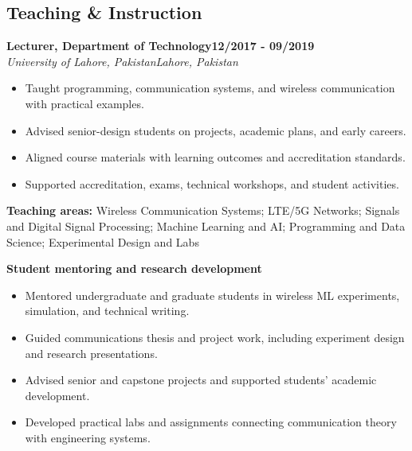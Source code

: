 \documentclass[9pt,letterpaper]{extarticle}
\newcommand{\role}[4]{%
  \Needspace{4\baselineskip}\textbf{#1}\hfill\textbf{#2}\\[-1pt]
  \textit{#3}\hfill\textit{#4}\par}
\begin{document}
\subsection{Teaching \& Instruction}
\role{Lecturer, Department of Technology}{12/2017 - 09/2019}{University of Lahore, Pakistan}{Lahore, Pakistan}
\begin{itemize}
\item Taught programming, communication systems, and wireless communication with practical examples.
\item Advised senior-design students on projects, academic plans, and early careers.
\item Aligned course materials with learning outcomes and accreditation standards.
\item Supported accreditation, exams, technical workshops, and student activities.
\end{itemize}
\vspace{1pt}
{\small\textbf{Teaching areas:} Wireless Communication Systems; LTE/5G Networks; Signals and Digital Signal Processing; Machine Learning and AI; Programming and Data Science; Experimental Design and Labs}\par
{}\noindent\textbf{Student mentoring and research development}\par
\begin{itemize}
\item Mentored undergraduate and graduate students in wireless ML experiments, simulation, and technical writing.
\item Guided communications thesis and project work, including experiment design and research presentations.
\item Advised senior and capstone projects and supported students' academic development.
\item Developed practical labs and assignments connecting communication theory with engineering systems.
\end{itemize}
\end{document}
